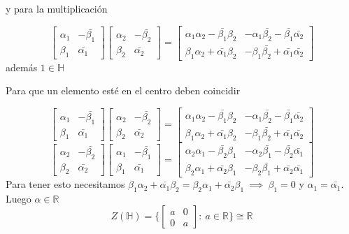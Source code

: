 y para la multiplicación

\[
  \begin{bmatrix}
    \alpha_1       &  -\bar{\beta_1} \\
    \beta_1       &  \bar{\alpha_1}
\end{bmatrix} \begin{bmatrix}
    \alpha_2       &  -\bar{\beta_2} \\
    \beta_2       &  \bar{\alpha_2}
\end{bmatrix} = \begin{bmatrix}
    \alpha_1\alpha_2 - \bar{\beta_1}\beta_2 & - \alpha_1 \bar{\beta_2} - \bar{\beta_1}\bar{\alpha_2} \\
    \beta_1\alpha_2 + \bar{\alpha_1}\beta_2       &  -\beta_1\bar{\beta_2} + \bar{\alpha_1}\bar{\alpha_2}
\end{bmatrix}
\]
además \(1 \in \mathbb{H}\)

Para que un elemento esté en el centro deben coincidir

\[
  \begin{bmatrix}
    \alpha_1       &  -\bar{\beta_1} \\
    \beta_1       &  \bar{\alpha_1}
\end{bmatrix} \begin{bmatrix}
    \alpha_2       &  -\bar{\beta_2} \\
    \beta_2       &  \bar{\alpha_2}
\end{bmatrix} = \begin{bmatrix}
    \alpha_1\alpha_2 - \bar{\beta_1}\beta_2 & - \alpha_1 \bar{\beta_2} - \bar{\beta_1}\bar{\alpha_2} \\
    \beta_1\alpha_2 + \bar{\alpha_1}\beta_2       &  -\beta_1\bar{\beta_2} +
    \bar{\alpha_1}\bar{\alpha_2}
\end{bmatrix}
\]
\[
   \begin{bmatrix}
    \alpha_2       &  -\bar{\beta_2} \\
    \beta_2       &  \bar{\alpha_2}
\end{bmatrix} \begin{bmatrix}
    \alpha_1       &  -\bar{\beta_1} \\
    \beta_1       &  \bar{\alpha_1}
\end{bmatrix}= \begin{bmatrix}
    \alpha_2\alpha_1 - \bar{\beta_2}\beta_1 & - \alpha_2 \bar{\beta_1} - \bar{\beta_2}\bar{\alpha_1} \\
    \beta_2\alpha_1 + \bar{\alpha_2}\beta_1       &  -\beta_2\bar{\beta_1} + \bar{\alpha_2}\bar{\alpha_1}
\end{bmatrix}
\]
Para tener esto necesitamos \(\beta_1 \alpha_2 + \bar{\alpha_1}\beta_2 =
\beta_2\alpha_1 + \bar{\alpha_2}\beta_1  \ \implies \ \beta_1 = 0\) y \(\alpha_1
= \bar{\alpha_1}\). Luego \(\alpha \in \mathbb{R}\)
\[
  Z(\mathbb{H}) =  \Big\{\begin{bmatrix}
    a       &  0 \\
   0 &  a
 \end{bmatrix}  : \ a \in \mathbb{R} \Big\} \cong \mathbb{R}
\]



